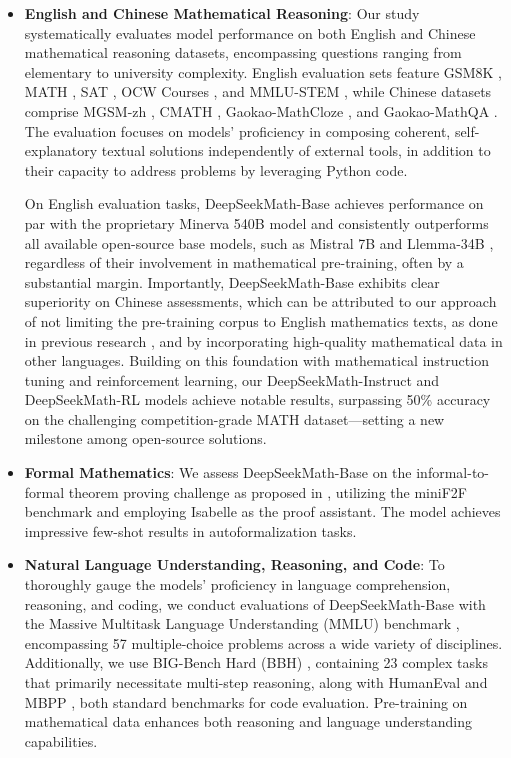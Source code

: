 \begin{itemize}[topsep=0pt]
    \item \textbf{English and Chinese Mathematical Reasoning}: Our study systematically evaluates model performance on both English and Chinese mathematical reasoning datasets, encompassing questions ranging from elementary to university complexity. English evaluation sets feature GSM8K \citep{gsm8k}, MATH \citep{MATH}, SAT \citep{llemma}, OCW Courses \citep{minerva}, and MMLU-STEM \citep{mmlu}, while Chinese datasets comprise MGSM-zh \citep{mgsm}, CMATH \citep{wei2023cmath}, Gaokao-MathCloze \citep{agieval}, and Gaokao-MathQA \citep{agieval}. The evaluation focuses on models' proficiency in composing coherent, self-explanatory textual solutions independently of external tools, in addition to their capacity to address problems by leveraging Python code.

On English evaluation tasks, DeepSeekMath-Base achieves performance on par with the proprietary Minerva 540B model \citep{minerva} and consistently outperforms all available open-source base models, such as Mistral 7B \citep{mistral} and Llemma-34B \citep{llemma}, regardless of their involvement in mathematical pre-training, often by a substantial margin. Importantly, DeepSeekMath-Base exhibits clear superiority on Chinese assessments, which can be attributed to our approach of not limiting the pre-training corpus to English mathematics texts, as done in previous research \citep{minerva,llemma}, and by incorporating high-quality mathematical data in other languages. Building on this foundation with mathematical instruction tuning and reinforcement learning, our DeepSeekMath-Instruct and DeepSeekMath-RL models achieve notable results, surpassing 50\% accuracy on the challenging competition-grade MATH dataset—setting a new milestone among open-source solutions.

\item \textbf{Formal Mathematics}: We assess DeepSeekMath-Base on the informal-to-formal theorem proving challenge as proposed in \citep{dsp_proof}, utilizing the miniF2F benchmark \citep{minif2f} and employing Isabelle \citep{isabelle} as the proof assistant. The model achieves impressive few-shot results in autoformalization tasks.
\item \textbf{Natural Language Understanding, Reasoning, and Code}: To thoroughly gauge the models' proficiency in language comprehension, reasoning, and coding, we conduct evaluations of DeepSeekMath-Base with the Massive Multitask Language Understanding (MMLU) benchmark \citep{mmlu}, encompassing 57 multiple-choice problems across a wide variety of disciplines. Additionally, we use BIG-Bench Hard (BBH) \citep{bbh}, containing 23 complex tasks that primarily necessitate multi-step reasoning, along with HumanEval \citep{codex} and MBPP \citep{mbpp}, both standard benchmarks for code evaluation. Pre-training on mathematical data enhances both reasoning and language understanding capabilities.


\end{itemize}
